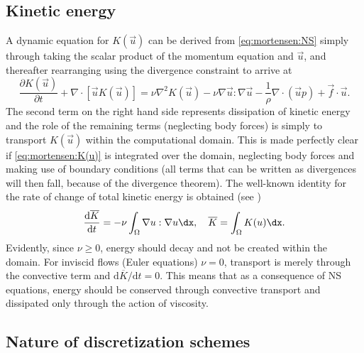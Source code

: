 \subsection{Kinetic energy}
\label{sec:mortensen:kinetic}
A dynamic equation for $K(\vec{u})$ can be derived from
\eqref{eq:mortensen:NS} simply through taking the scalar product of
the momentum equation and $\vec{u}$, and thereafter rearranging using
the divergence constraint to arrive at
\begin{equation}
 \frac{\partial K(\vec{u})}{\partial t} + \nabla \cdot [\vec{u}K(\vec{u})] = \nu \nabla^2 K(\vec{u}) -\nu \nabla \vec{u} : \nabla \vec{u} - \frac{1}{\rho}\nabla \cdot \left(\vec{u}p \right) +\vec{f}\cdot \vec{u}.
 \label{eq:mortensen:K(u)}
\end{equation}
The second term on the right hand side represents dissipation of
kinetic energy and the role of the remaining terms (neglecting body
forces) is simply to transport $K(\vec{u})$ within the computational
domain. This is made perfectly clear if \eqref{eq:mortensen:K(u)} is
integrated over the domain, neglecting body forces and making use of
boundary conditions (all terms that can be written as divergences will
then fall, because of the divergence theorem). The well-known identity
for the rate of change of total kinetic energy is obtained (see
\citet{SimoArmero1994}) 
\begin{equation}
 \frac{\text{d} \overline{K} }{\text{d} t} = - \nu \int_\Omega \nabla
 \vec{u} : \nabla \vec{u} \dx,
\quad \overline{K} = \int_{\Omega} K(\vec{u}) \dx .
\end{equation}
Evidently, since $\nu \ge 0$, energy should decay and not be created
within the domain. For inviscid flows (Euler equations) $\nu=0$,
transport is merely through the convective term and $\text{d}
\overline{K}/\text{d} t = 0$. This means that as a consequence of NS
equations, energy should be conserved through convective transport and
dissipated only through the action of viscosity.
\subsection{Nature of discretization schemes}
\label{sec:mortensen:dissipative:dispersive}


